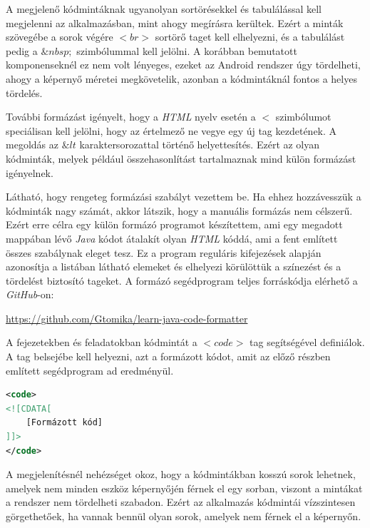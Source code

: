 \documentclass[12pt,a4paper]{article}
\begin{document}
	A megjelenő kódmintáknak ugyanolyan sortörésekkel és tabulálással kell megjelenni az alkalmazásban, mint ahogy megírásra kerültek. Ezért a minták szövegébe a sorok végére $<br>$ sortörő taget kell elhelyezni, és a tabulálást pedig a $\&nbsp;$ szimbólummal kell jelölni. A korábban bemutatott komponenseknél ez nem volt lényeges, ezeket az Android rendszer úgy tördelheti, ahogy a képernyő méretei megkövetelik, azonban a kódmintáknál fontos a helyes tördelés.
	
	További formázást igényelt, hogy a \textit{HTML} nyelv esetén a $<$ szimbólumot speciálisan kell jelölni, hogy az értelmező ne vegye egy új tag kezdetének. A megoldás az $\&lt$ karaktersorozattal történő helyettesítés. Ezért az olyan kódminták, melyek például összehasonlítást tartalmaznak mind külön formázást igényelnek.
	
	Látható, hogy rengeteg formázási szabályt vezettem be. Ha ehhez hozzávesszük a kódminták nagy számát, akkor látszik, hogy a manuális formázás nem célszerű. Ezért erre  célra egy külön formázó programot készítettem, ami egy megadott mappában lévő \textit{Java} kódot átalakít olyan \textit{HTML} kóddá, ami a fent említett összes szabálynak eleget tesz. Ez a program reguláris kifejezések alapján azonosítja a listában látható elemeket és elhelyezi körülöttük a színezést és a tördelést biztosító tageket. A formázó segédprogram teljes forráskódja elérhető a \textit{GitHub}-on:
	
	\begin{center}
		\url{https://github.com/Gtomika/learn-java-code-formatter}
	\end{center}  
	
	A fejezetekben és feladatokban kódmintát a $<code>$ tag segítségével definiálok. A tag belsejébe kell helyezni, azt a formázott kódot, amit az előző részben említett segédprogram ad eredményül.
	
	\bigskip
	\begin{lstlisting}[language=XML]
<code>
<![CDATA[
	[Formázott kód]
]]>
</code>	
	\end{lstlisting}
	\bigskip
	
	A megjelenítésnél nehézséget okoz, hogy a kódmintákban kosszú sorok lehetnek, amelyek nem minden eszköz képernyőjén férnek el egy sorban, viszont a mintákat a rendszer nem tördelheti szabadon. Ezért az alkalmazás kódmintái vízszintesen görgethetőek, ha vannak bennül olyan sorok, amelyek nem férnek el a képernyőn.
	
\end{document}
